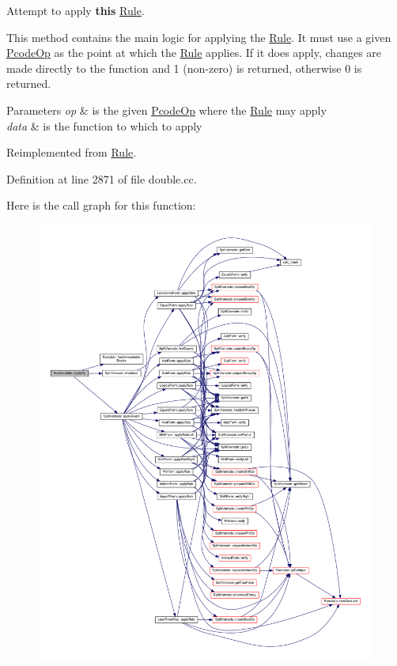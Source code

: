 Attempt to apply {\bfseries{this}} \mbox{\hyperlink{class_rule}{Rule}}. 

This method contains the main logic for applying the \mbox{\hyperlink{class_rule}{Rule}}. It must use a given \mbox{\hyperlink{class_pcode_op}{Pcode\+Op}} as the point at which the \mbox{\hyperlink{class_rule}{Rule}} applies. If it does apply, changes are made directly to the function and 1 (non-\/zero) is returned, otherwise 0 is returned. 
\begin{DoxyParams}{Parameters}
{\em op} & is the given \mbox{\hyperlink{class_pcode_op}{Pcode\+Op}} where the \mbox{\hyperlink{class_rule}{Rule}} may apply \\
\hline
{\em data} & is the function to which to apply \\
\hline
\end{DoxyParams}


Reimplemented from \mbox{\hyperlink{class_rule_a4e3e61f066670175009f60fb9dc60848}{Rule}}.



Definition at line 2871 of file double.\+cc.

Here is the call graph for this function\+:
\nopagebreak
\begin{figure}[H]
\begin{center}
\leavevmode
\includegraphics[width=350pt]{class_rule_double_in_acde0bde06644b6bf122d096fccfb082f_cgraph}
\end{center}
\end{figure}
\mbox{\label{class_rule_double_in_a43626154c6e567ac9b235f4f9c05439d}} 
